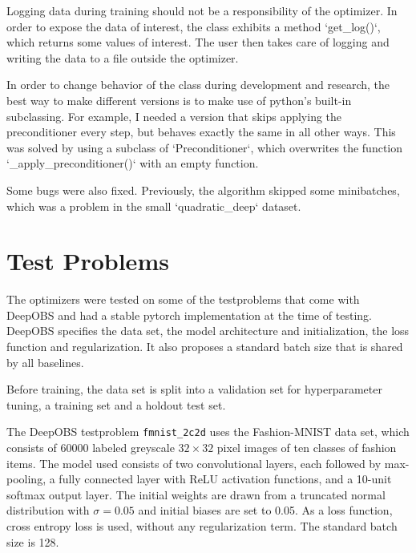 \documentclass[twoside,12pt,a4paper]{report}
\begin{document}
\begin{markdown}
Logging data during training should not be a responsibility of the optimizer. In order to expose the data of interest, the class exhibits a method `get_log()`, which returns some values of interest. The user then takes care of logging and writing the data to a file outside the optimizer.

In order to change behavior of the class during development and research, the best way to make different versions is to make use of python's built-in subclassing. For example, I needed a version that skips applying the preconditioner every step, but behaves exactly the same in all other ways. This was solved by using a subclass of `Preconditioner`, which overwrites the function `_apply_preconditioner()` with an empty function.

Some bugs were also fixed. Previously, the algorithm skipped some minibatches, which was a problem in the small `quadratic_deep` dataset.
\end{markdown}

\section{Test Problems}
The optimizers were tested on some of the testproblems that come with DeepOBS and had a stable pytorch implementation at the time of testing. DeepOBS specifies the data set, the model architecture and initialization, the loss function and regularization. It also proposes a standard batch size that is shared by all baselines.

Before training, the data set is split into a validation set for hyperparameter tuning, a training set and a holdout test set.

The DeepOBS testproblem \verb|fmnist_2c2d| uses the Fashion-MNIST data set, which consists of 60000 labeled greyscale $32 \times 32$ pixel images of ten classes of fashion items. The model used consists of two convolutional layers, each followed by max-pooling, a fully connected layer with ReLU activation functions, and a 10-unit softmax output layer. The initial weights are drawn from a truncated normal distribution with $\sigma = 0.05$ and initial biases are set to 0.05. As a loss function, cross entropy loss is used, without any regularization term. The standard batch size is 128.
\end{document}
